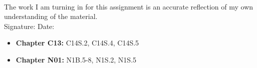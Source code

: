 \documentclass[12pt]{article}
\begin{document}
\\

\bigskip
\bigskip

\noindent The work I am turning in for this assignment is an accurate
reflection of my own understanding of the material.\\[14pt]

\noindent Signature: \underline{\hspace{7cm}} \hspace{1cm} Date:
\underline{\hspace{5cm}}\\



\hline 

\medskip
\begin{itemize}
\item {\bf Chapter C13:} C14S.2, C14S.4, C14S.5
\item {\bf Chapter N01:} N1B.5-8, N1S.2, N1S.5
\end{itemize}
\end{document}
